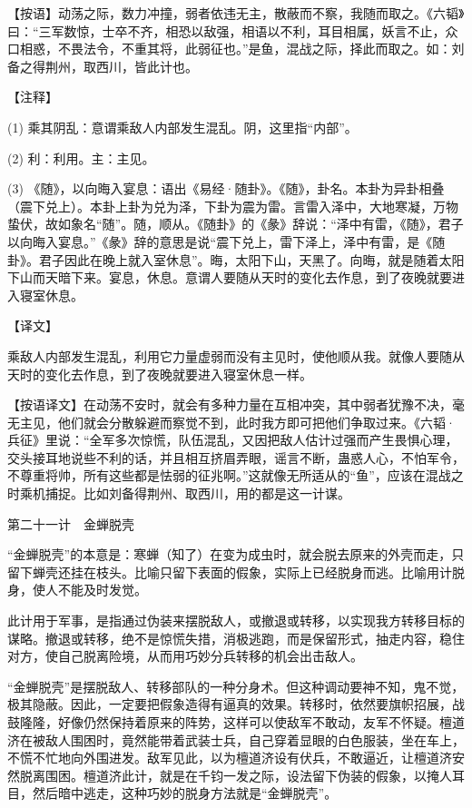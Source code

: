 \documentclass[12pt,UTF8]{ctexbook}
\begin{document}
【按语】动荡之际，数力冲撞，弱者依违无主，散蔽而不察，我随而取之。《六韬》曰：“三军数惊，士卒不齐，相恐以敌强，相语以不利，耳目相属，妖言不止，众口相惑，不畏法令，不重其将，此弱征也。”是鱼，混战之际，择此而取之。如：刘备之得荆州，取西川，皆此计也。





【注释】


(1) 乘其阴乱：意谓乘敌人内部发生混乱。阴，这里指“内部”。

(2) 利：利用。主：主见。

(3) 《随》，以向晦入宴息：语出《易经·随卦》。《随》，卦名。本卦为异卦相叠（震下兑上）。本卦上卦为兑为泽，下卦为震为雷。言雷入泽中，大地寒凝，万物蛰伏，故如象名“随”。随，顺从。《随卦》的《彖》辞说：“泽中有雷，《随》，君子以向晦入宴息。”《彖》辞的意思是说“震下兑上，雷下泽上，泽中有雷，是《随卦》。君子因此在晚上就入室休息”。晦，太阳下山，天黑了。向晦，就是随着太阳下山而天暗下来。宴息，休息。意谓人要随从天时的变化去作息，到了夜晚就要进入寝室休息。





【译文】


乘敌人内部发生混乱，利用它力量虚弱而没有主见时，使他顺从我。就像人要随从天时的变化去作息，到了夜晚就要进入寝室休息一样。

【按语译文】在动荡不安时，就会有多种力量在互相冲突，其中弱者犹豫不决，毫无主见，他们就会分散躲避而察觉不到，此时我方即可把他们争取过来。《六韬·兵征》里说：“全军多次惊慌，队伍混乱，又因把敌人估计过强而产生畏惧心理，交头接耳地说些不利的话，并且相互挤眉弄眼，谣言不断，蛊惑人心，不怕军令，不尊重将帅，所有这些都是怯弱的征兆啊。”这就像无所适从的“鱼”，应该在混战之时乘机捕捉。比如刘备得荆州、取西川，用的都是这一计谋。





第二十一计　金蝉脱壳


“金蝉脱壳”的本意是：寒蝉（知了）在变为成虫时，就会脱去原来的外壳而走，只留下蝉壳还挂在枝头。比喻只留下表面的假象，实际上已经脱身而逃。比喻用计脱身，使人不能及时发觉。

此计用于军事，是指通过伪装来摆脱敌人，或撤退或转移，以实现我方转移目标的谋略。撤退或转移，绝不是惊慌失措，消极逃跑，而是保留形式，抽走内容，稳住对方，使自己脱离险境，从而用巧妙分兵转移的机会出击敌人。

“金蝉脱壳”是摆脱敌人、转移部队的一种分身术。但这种调动要神不知，鬼不觉，极其隐蔽。因此，一定要把假象造得有逼真的效果。转移时，依然要旗帜招展，战鼓隆隆，好像仍然保持着原来的阵势，这样可以使敌军不敢动，友军不怀疑。檀道济在被敌人围困时，竟然能带着武装士兵，自己穿着显眼的白色服装，坐在车上，不慌不忙地向外围进发。敌军见此，以为檀道济设有伏兵，不敢逼近，让檀道济安然脱离围困。檀道济此计，就是在千钧一发之际，设法留下伪装的假象，以掩人耳目，然后暗中逃走，这种巧妙的脱身方法就是“金蝉脱壳”。
\end{document}
